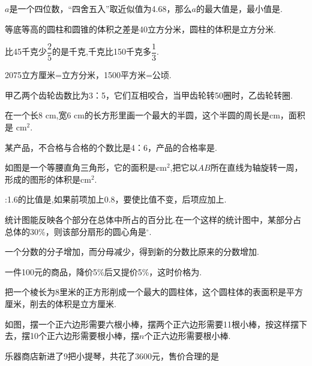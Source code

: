 \documentclass[marginline,answers]{BHCexam}
\begin{document}
\maketitle

\begin{questions}


\tiankong
\question $a$是一个四位数，“四舍五入”取近似值为4.68，那么$a$的最大值是，最小值是.

\question 等底等高的圆柱和圆锥的体积之差是40立方分米，圆柱的体积是立方分米.

\question 比45千克少$\dfrac{2}{5}$的是千克,千克比150千克多$\dfrac{1}{3}$.

\question 2075立方厘米=立方分米，1500平方米=公顷.

\question 甲乙两个齿轮齿数比为3：5，它们互相咬合，当甲齿轮转50圈时，乙齿轮转圈.

\question 在一个长8 cm,宽6 cm的长方形里画一个最大的半圆，这个半圆的周长是cm，面积是 cm$^{2}$.

\question 某产品，不合格与合格的个数比是4：6，产品的合格率是.

\question 如图是一个等腰直角三角形，它的面积是cm$^{2}$,把它以$AB$所在直线为轴旋转一周，形成的图形的体积是cm$^{2}$.

:1.6的比值是,如果前项加上0.8，要使比值不变，后项应加上.

\question {}统计图能反映各个部分在总体中所占的百分比.在一个这样的统计图中，某部分占总体的30\%，则该部分扇形的圆心角是$^\circ$.

\question 一个分数的分子增加，而分母减少，得到新的分数比原来的分数增加.

\question 一件100元的商品，降价5\%后又提价5\%，这时价格为.

\question 把一个棱长为8里米的正方形削成一个最大的圆柱体，这个圆柱体的表面积是平方厘米，削去的体积是立方厘米.

\question 如图，摆一个正六边形需要六根小棒，摆两个正六边形需要11根小棒，按这样摆下去，摆10个正六边形需要根小棒，摆$n$个正六边形需要根小棒.


\xuanze

\question 乐器商店新进了9把小提琴，共花了3600元，售价合理的是



\end{questions}
\end{document}
